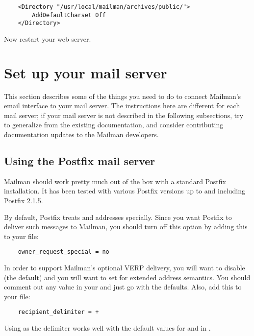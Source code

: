 \documentclass{howto}
\begin{document}
\begin{verbatim}
    <Directory "/usr/local/mailman/archives/public/">
        AddDefaultCharset Off
    </Directory>
\end{verbatim}

Now restart your web server.

\section{Set up your mail server\label{mail-server}}

This section describes some of the things you need to do to connect Mailman's
email interface to your mail server.  The instructions here are different for
each mail server; if your mail server is not described in the following
subsections, try to generalize from the existing documentation, and consider
contributing documentation updates to the Mailman developers.

\subsection{Using the Postfix mail server}

Mailman should work pretty much out of the box with a standard Postfix
installation.  It has been tested with various Postfix versions up to and
including Postfix 2.1.5.

By default, Postfix treats  and  addresses
specially.  Since you want Postfix to deliver such messages to Mailman, you
should turn off this option by adding this to your  file:

\begin{verbatim}
    owner_request_special = no
\end{verbatim}

In order to support Mailman's optional VERP delivery, you will want to disable
 (the default) and you will want to set
 for extended address semantics.  You should comment
out any  value in your  and just go with the
defaults.  Also, add this to your  file:

\begin{verbatim}
    recipient_delimiter = +
\end{verbatim}

Using \samp{+} as the delimiter works well with the default values for
 and  in .
\end{document}
